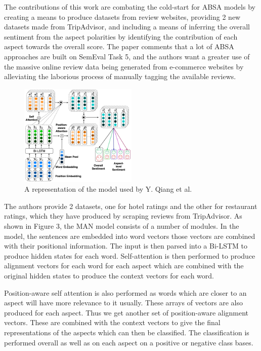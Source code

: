 \documentclass[conference]{IEEEtran}
\begin{document}
The contributions of this work are combating the cold-start for ABSA models by creating a means to produce datasets from review websites, providing 2 new datasets made from TripAdvisor, and including a means of inferring the overall sentiment from the aspect polarities by identifying the contribution of each aspect towards the overall score. The paper comments that a lot of ABSA approaches are built on SemEval Task 5, and the authors want a greater use of the massive online review data being generated from e-commerce websites by alleviating the laborious process of manually tagging the available reviews.

\begin{figure}[htbp]
\centerline{\includegraphics[keepaspectratio, width=0.5\textwidth]{pics/3.png}}
\caption{A representation of the model used by Y. Qiang et al.}
\label{fig}
\end{figure}

The authors provide 2 datasets, one for hotel ratings and the other for restaurant ratings, which they have produced by scraping reviews from TripAdvisor. As shown in Figure 3, the MAN model consists of a number of modules. In the model, the sentences are embedded into word vectors those vectors are combined with their positional information. The input is then parsed into a Bi-LSTM to produce hidden states for each word. Self-attention is then performed to produce alignment vectors for each word for each aspect which are combined with the original hidden states to produce the context vectors for each word.

Position-aware self attention is also performed as words which are closer to an aspect will have more relevance to it usually. These arrays of vectors are also produced for each aspect. Thus we get another set of position-aware alignment vectors. These are combined with the context vectors to give the final representations of the aspects which can then be classified. The classification is performed overall as well as on each aspect on a positive or negative class bases.
\end{document}
